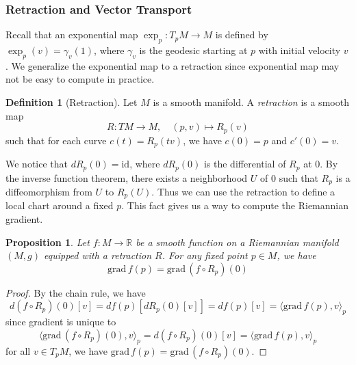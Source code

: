 \documentclass[12pt,a4paper,draft]{article}  %
\newtheorem{proposition}{Proposition}[section]
\theoremstyle{definition}
\newtheorem{definition}{Definition}[section]
\numberwithin{equation}{section}
\newcommand{\RR}{\mathbb{R}}
\newcommand{\grad}{\mathrm{grad}\,}
\begin{document}
\subsubsection{Retraction and Vector Transport}
Recall that an exponential map $\exp_p: T_p M \to M$ is defined by $\exp_p(v) = \gamma_v(1)$, where $\gamma_v$ is the geodesic starting at $p$ with initial velocity $v$. We generalize the exponential map to a retraction since  exponential map may not be easy to compute in practice.
\begin{definition}[Retraction]
        Let $M$ is a smooth manifold. A \emph{retraction} is a smooth map $$R: TM\to M,\quad (p,v)\mapsto R_p(v)$$ such that for each curve $c(t) = R_p(t v)$, we have $c(0) = p$ and $c'(0) = v$.
\end{definition}
We notice that $dR_p(0) = \mathrm{id}$, where $dR_p(0)$ is the differential of $R_p$ at $0$. By the inverse function theorem, there exists a neighborhood $U$ of $0$ such that $R_p$ is a diffeomorphism from $U$ to $R_p(U)$. Thus we can use the retraction to define a local chart around a fixed $p$. This fact gives us a way to compute the Riemannian gradient.
\begin{proposition}
        Let $f: M \to \RR$ be a smooth function on a Riemannian manifold $(M,g)$ equipped with a retraction $R$. For any fixed point $p \in M$, we have
\[
\grad f(p) = \grad (f \circ R_p)(0)
\]
\end{proposition}
\begin{proof}
        By the chain rule, we have
\[
d(f \circ R_p)(0)[v] = df(p)[dR_p(0)[v]] = df(p)[v] = \langle \grad f(p), v \rangle_p
\]
since gradient is unique to
\[
\langle \grad (f \circ R_p)(0), v \rangle_p = d(f \circ R_p)(0)[v] = \langle \grad f(p), v \rangle_p
\]
for all $v \in T_p M$, we have $\grad f(p) = \grad (f \circ R_p)(0)$.
\end{proof}
\end{document}
